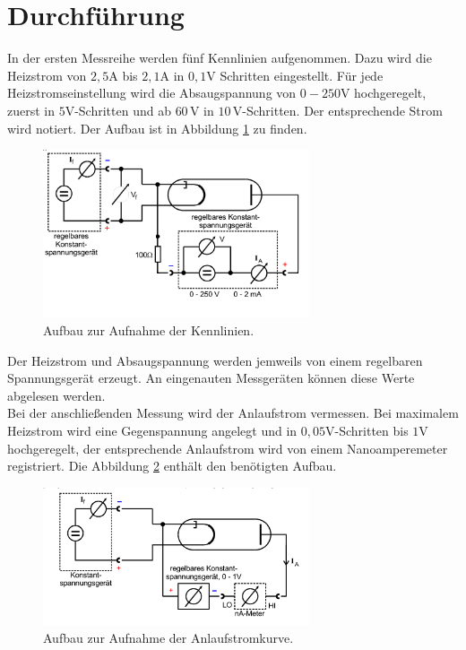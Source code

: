 \section{Durchführung}
\label{sec:Durchführung}
In der ersten Messreihe werden fünf Kennlinien aufgenommen. Dazu wird die Heizstrom von $2,5\si{\ampere}$ bis $2,1\si{\ampere}$
in $0,1\si{\volt}$ Schritten eingestellt. Für jede Heizstromseinstellung wird die Absaugspannung von $0-250\si{\volt}$ hochgeregelt,
zuerst in $5\si{\volt}$-Schritten und ab $60\,\si{\volt}$ in $10\,\si{\volt}$-Schritten.
Der entsprechende Strom wird notiert. Der Aufbau ist in Abbildung \ref{fig:aufbau1} zu finden.
\begin{figure}
 \centering
 \includegraphics[width=0.7\textwidth]{Aufbaukenn.png}
 \caption{Aufbau zur Aufnahme der Kennlinien.\cite{sample}}
 \label{fig:aufbau1}
 \end{figure}
Der Heizstrom und Absaugspannung werden jemweils von einem regelbaren Spannungsgerät erzeugt.
An eingenauten Messgeräten können diese Werte abgelesen werden.\\
Bei der anschließenden Messung wird der Anlaufstrom vermessen. Bei maximalem Heizstrom wird eine Gegenspannung angelegt und
in $0,05\si{\volt}$-Schritten bis $1\si{\volt}$ hochgeregelt, der entsprechende Anlaufstrom wird von einem Nanoamperemeter registriert.
Die Abbildung \ref{fig:aufbau2} enthält den benötigten Aufbau.
\begin{figure}
 \centering
 \includegraphics[width=0.7\textwidth]{Aufbauan.png}
 \caption{Aufbau zur Aufnahme der Anlaufstromkurve.\cite{sample}}
 \label{fig:aufbau2}
 \end{figure}
